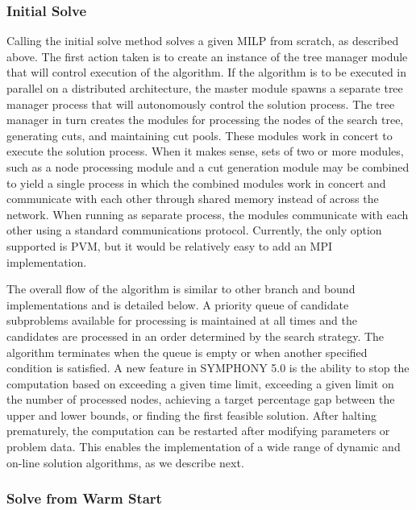 \subsubsection{Initial Solve}\label{initial_solve}

Calling the initial solve method solves a given MILP from scratch, as
described above. The first action taken is to create an instance of the tree
manager module that will control execution of the algorithm. If the algorithm
is to be executed in parallel on a distributed architecture, the master module
spawns a separate tree manager process that will autonomously control the
solution process. The tree manager in turn creates the modules for processing
the nodes of the search tree, generating cuts, and maintaining cut pools.
These modules work in concert to execute the solution process. When it makes
sense, sets of two or more modules, such as a node processing module and a cut
generation module may be combined to yield a single process in which the
combined modules work in concert and communicate with each other through
shared memory instead of across the network. When running as separate process,
the modules communicate with each other using a standard communications
protocol. Currently, the only option supported is PVM, but it would be
relatively easy to add an MPI implementation.

The overall flow of the algorithm is similar to other branch and bound
implementations and is detailed below. A priority queue of candidate
subproblems available for processing is maintained at all times and the
candidates are processed in an order determined by the search strategy. The
algorithm terminates when the queue is empty or when another specified
condition is satisfied. A new feature in SYMPHONY 5.0 is the ability to stop
the computation based on exceeding a given time limit, exceeding a given limit
on the number of processed nodes, achieving a target percentage gap between
the upper and lower bounds, or finding the first feasible solution. After
halting prematurely, the computation can be restarted after modifying
parameters or problem data. This enables the implementation of a wide range of
dynamic and on-line solution algorithms, as we describe next.

\subsubsection{Solve from Warm Start} \label{resolve}

